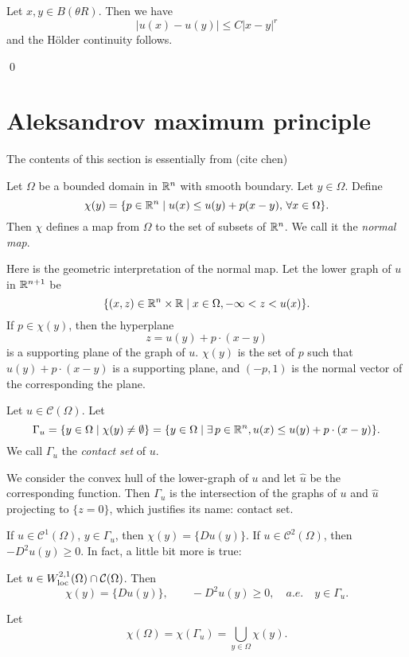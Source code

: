 Let $x,y\in  B(\theta R)$. Then we have
\[
|u(x)-u(y)|\leq 
C|x-y|^r
\]
and the H\"older continuity follows.

\qed


\section{Aleksandrov maximum principle}\label{ABP_principle}
The contents of this section is essentially from (cite chen)
\begin{definition}\label{def8} Let $\Omega$ be a bounded domain in $\mathbb R^n$ with smooth boundary. Let $y\in\Omega$. Define
\[
\chi(y)=\{p\in\mathbb R^n\mid u(x)\leq u(y)+p(x-y),\,\forall x\in \Omega\}.
\]
Then $\chi$ defines a map from $\Omega$ to the set of subsets of $\mathbb R^n$. We call it the \emph{normal map}.
\end{definition}

Here is the geometric interpretation of the normal map. Let the lower graph of $u$ in $\mathbb R^{n+1}$ be
\[
\{(x,z)\in\mathbb R^n\times \mathbb R\mid x\in\Omega, -\infty<z<u(x)\}. 
\]
If $p\in\chi(y)$, then the hyperplane
\[
z=u(y)+p\cdot(x-y)
\]
is a supporting plane of the graph of $u$. $\chi(y)$ is the set of $p$ such that $u(y)+p\cdot(x-y)$ is a supporting plane, and $(-p,1)$ is the normal vector of the corresponding the plane.

\begin{definition}\label{def9} Let $u\in \mathcal C(\Omega)$. Let 
\[
\Gamma_u=\{y\in\Omega\mid \chi(y)\neq\emptyset\}=\{y\in\Omega\mid \exists \,p\in\mathbb R^n, u(x)\leq u(y)+p\cdot(x-y)\}.
\]
We call $\Gamma_u$ the \emph{contact set} of $u$.
\end{definition}

We consider the convex hull of the lower-graph of $u$ and let $\hat u$ be the corresponding function.
Then $\Gamma_u$ is the intersection  of the graphs of $u$ and $\hat u$ projecting to $\{z=0\}$, which justifies its name: contact set.

If $u\in \mathcal C^1(\Omega)$, $y\in\Gamma_u$, then $\chi(y)=\{Du(y)\}$. If $u\in \mathcal C^2(\Omega)$, then $-D^2u(y)\geq 0$. In fact, a little bit more is true:

\begin{lemma} Let $u\in W_{{\rm loc}}^{2,1}(\Omega)\cap \mathcal C(\Omega)$. Then
\[
\chi(y)=\{Du(y)\},\qquad -D^2u(y)\geq 0,\quad a.e.\quad y\in\Gamma_u.
\]
\end{lemma}

\begin{definition} Let
\[
\chi(\Omega)=\chi(\Gamma_u)=\bigcup_{y\in\Omega}\chi(y).
\]
\end{definition}

